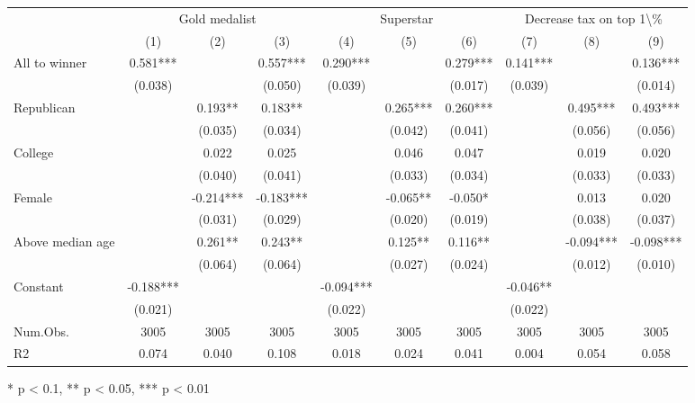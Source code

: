 \begin{table}[t]
\fontsize{12.0pt}{14.4pt}\selectfont
\begin{tabular*}{\linewidth}{@{\extracolsep{\fill}}lccccccccc}
\toprule
 & \multicolumn{3}{c}{Gold medalist} & \multicolumn{3}{c}{Superstar} & \multicolumn{3}{c}{Decrease tax on top 1\textbackslash{}\%} \\ 
\cmidrule(lr){2-4} \cmidrule(lr){5-7} \cmidrule(lr){8-10}
  & (1) & (2) & (3) & (4) & (5) & (6) & (7) & (8) & (9) \\ 
\midrule\addlinespace[2.5pt]
All to winner & 0.581*** &  & 0.557*** & 0.290*** &  & 0.279*** & 0.141*** &  & 0.136*** \\ 
 & (0.038) &  & (0.050) & (0.039) &  & (0.017) & (0.039) &  & (0.014) \\ 
Republican &  & 0.193** & 0.183** &  & 0.265*** & 0.260*** &  & 0.495*** & 0.493*** \\ 
 &  & (0.035) & (0.034) &  & (0.042) & (0.041) &  & (0.056) & (0.056) \\ 
College &  & 0.022 & 0.025 &  & 0.046 & 0.047 &  & 0.019 & 0.020 \\ 
 &  & (0.040) & (0.041) &  & (0.033) & (0.034) &  & (0.033) & (0.033) \\ 
Female &  & -0.214*** & -0.183*** &  & -0.065** & -0.050* &  & 0.013 & 0.020 \\ 
 &  & (0.031) & (0.029) &  & (0.020) & (0.019) &  & (0.038) & (0.037) \\ 
Above median age &  & 0.261** & 0.243** &  & 0.125** & 0.116** &  & -0.094*** & -0.098*** \\ 
 &  & (0.064) & (0.064) &  & (0.027) & (0.024) &  & (0.012) & (0.010) \\ 
Constant & -0.188*** &  &  & -0.094*** &  &  & -0.046** &  &  \\ 
{} & {(0.021)} & {} & {} & {(0.022)} & {} & {} & {(0.022)} & {} & {} \\ 
Num.Obs. & 3005 & 3005 & 3005 & 3005 & 3005 & 3005 & 3005 & 3005 & 3005 \\ 
R2 & 0.074 & 0.040 & 0.108 & 0.018 & 0.024 & 0.041 & 0.004 & 0.054 & 0.058 \\ 
\bottomrule
\end{tabular*}
\begin{minipage}{\linewidth}
* p < 0.1, ** p < 0.05, *** p < 0.01\\
\end{minipage}
\end{table}

